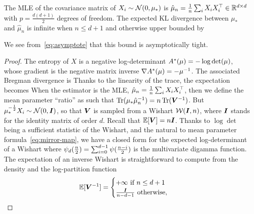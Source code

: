 \begin{theorem}
	The MLE of  the covariance matrix of $X_i\sim\cN(0,\mu_*)$ is $\hat \mu_n = \inv{n} \sum_i X_i X_i^\top \in\real^{d\times d}$ with $p = \frac{d(d+1)}{2} $ degrees of freedom. 
	The expected KL divergence between $\mu_*$ and $\hat\mu_n$ 
	is infinite when $n\leq d+1$ and otherwise upper bounded by
\end{theorem}
We see from~\eqref{eq:asymptote} that this bound is asymptotically tight.
\begin{proof}
The entropy of $X$ is a negative log-determinant $\conj(\mu) = -\log\det(\mu)$, whose gradient is the negative matrix inverse $\nabla\conj (\mu) = - \mu^{-1}$.
The associated Bregman divergence is
Thanks to the linearity of the trace, the expectation becomes
When the estimator is the MLE, $\hat \mu_n = \inv{n} \sum_i X_i X_i^\top$, 
then we define the mean parameter ``ratio'' as
such that $\Tr(\mu_* \hat \mu_n^{-1})  = n \Tr(\mV^{-1})$.
But $\mu_*^{-\half}X_i \sim \cN(0,\mI)$, so that $\mV$
is sampled from a Wishart  $\cW(\mI, n)$, where $\mI$ stands for the identity matrix of order $d$.
Recall that $\E[\mV] = n \mI$.
Thanks to $\log\det$ being a sufficient statistic of the Wishart, and the natural to mean parameter formula~\eqref{eq:mirror-map}, we have a closed form for the expected log-determinant of a Wishart 
where $\psi_d(\half[n]) = \sum_{i=0}^{d-1} \psi ( \half[n - i])$ is the multivariate digamma function.
The expectation of an inverse Wishart  is straightforward to compute from the density and the log-partition function
\begin{equation}
	\E[\mV^{-1}] = \begin{cases}
		+\infty \text{ if } n\leq d+1 \\
		 \frac{\mI}{n - d - 1} \text{ otherwise,} 
	\end{cases}
\end{equation}

\end{proof}
